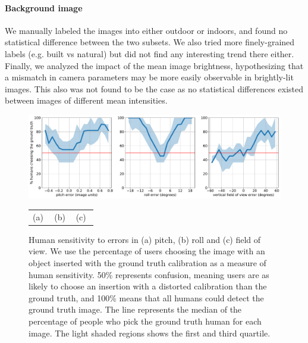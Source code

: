\paragraph{Background image}

We manually labeled the images into either outdoor or indoors, and found no statistical difference between the two subsets. We also tried more finely-grained labels (e.g. built vs natural) but did not find any interesting trend there either. Finally, we analyzed the impact of the mean image brightness, hypothesizing that a mismatch in camera parameters may be more easily observable in brightly-lit images. This also was not found to be the case as no statistical differences existed between images of different mean intensities. 

\begin{figure}
\centering
\includegraphics[width=\linewidth]{figures/pstudy/reduced_param_errors_pm_image_units_confusion.pdf} \\
\vspace{-0.1cm}
\begin{tabular}{p{0.3\linewidth}p{0.3\linewidth}p{0.3\linewidth}}
\hspace{1.15cm}(a) & \hspace{1cm}(b) & \hspace{0.85cm}(c)
\end{tabular}
\caption[Human sensitivity to calibration errors]{Human sensitivity to errors in (a) pitch, (b) roll and (c) field of view. We use the percentage of users choosing the image with an object inserted with the ground truth calibration as a measure of human sensitivity. 50\% represents confusion, meaning users are as likely to choose an insertion with a distorted calibration than the ground truth, and 100\% means that all humans could detect the ground truth image. The line represents the median of the percentage of people who pick the ground truth human for each image. The light shaded regions shows the first and third quartile.}
\label{fig:pstudy_overall_sensitivity}
\end{figure}


